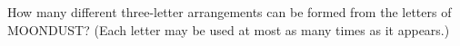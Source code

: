 How many different three-letter arrangements can be formed from the letters of MOONDUST? (Each letter may be used at most as many times as it appears.)
